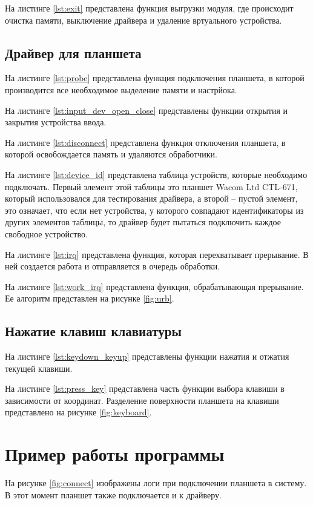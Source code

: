 На листинге \ref{lst:exit} представлена функция выгрузки модуля, где происходит очистка памяти, выключение драйвера и удаление вртуального устройства.

\subsection{Драйвер для планшета}

На листинге \ref{lst:probe} представлена функция подключения планшета, в которой производится все необходимое выделение памяти и настрйока.

На листинге \ref{lst:input_dev_open_close} представлены функции открытия и закрытия устройства ввода.

На листинге \ref{lst:disconnect} представлена функция отключения планшета, в которой освобождается память и удаляются обработчики.

На листинге \ref{lst:device_id} представлена таблица устройств, которые необходимо подключать. Первый элемент этой таблицы это планшет Wacom Ltd CTL-671, который использовался для тестирования драйвера, а второй -- пустой элемент, это означает, что если нет устройства, у которого совпадают идентификаторы из других элементов таблицы, то драйвер будет пытаться подключить каждое свободное устройство.

На листинге \ref{lst:irq} представлена функция, которая перехватывает прерывание. В ней создается работа и отправляется в очередь обработки.

На листинге \ref{lst:work_irq} представлена функция, обрабатывающая прерывание. Ее алгоритм представлен на рисунке \ref{fig:urb}.

\subsection{Нажатие клавиш клавиатуры}

На листинге \ref{lst:keydown_keyup} представлены функции нажатия и отжатия текущей клавиши.

На листинге \ref{lst:press_key} представлена часть функции выбора клавиши в зависимости от координат. Разделение поверхности планшета на клавиши представлено на рисунке \ref{fig:keyboard}.

\section{Пример работы программы}

На рисунке \ref{fig:connect} изображены логи при подключении планшета в систему. В этот момент планшет также подключается и к драйверу.

